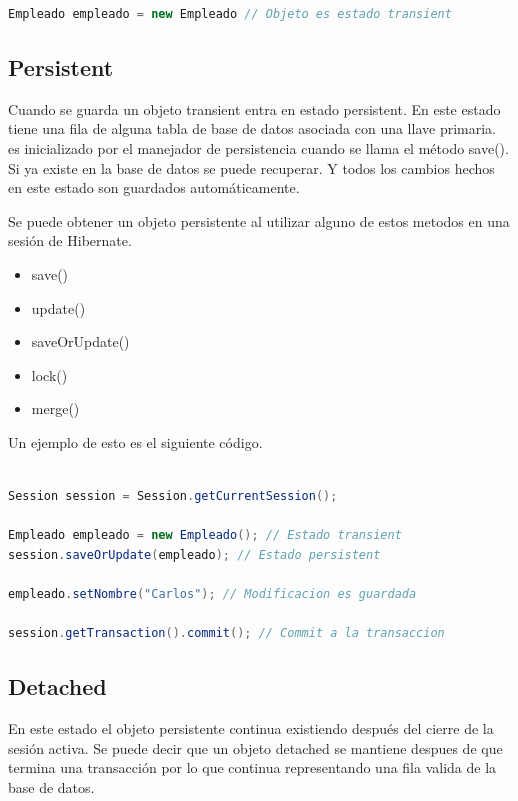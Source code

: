 \documentclass[a4paper,12pt]{article}
\begin{document}
\begin{lstlisting}[language=Java,style=customJava,basicstyle=\fontfamily{cmss}
\small]
Empleado empleado = new Empleado // Objeto es estado transient
\end{lstlisting}

\subsection{Persistent}
Cuando se guarda un objeto transient entra en estado persistent. En este estado 
tiene una fila de alguna tabla de base de datos asociada con una llave 
primaria. es inicializado por el manejador de persistencia cuando se llama el 
método save(). Si ya existe en la base de datos se puede recuperar. Y todos los 
cambios hechos en este estado son guardados automáticamente.

Se puede obtener un objeto persistente al utilizar alguno de estos metodos en 
una sesión de Hibernate.
\begin{itemize}
 \item save()
 \item update()
 \item saveOrUpdate()
 \item lock()
 \item merge()
\end{itemize}

Un ejemplo de esto es el siguiente código.
\begin{lstlisting}[language=Java,style=customJava,basicstyle=\fontfamily{cmss}
\small]

Session session = Session.getCurrentSession();

Empleado empleado = new Empleado(); // Estado transient
session.saveOrUpdate(empleado); // Estado persistent

empleado.setNombre("Carlos"); // Modificacion es guardada

session.getTransaction().commit(); // Commit a la transaccion

\end{lstlisting}

\subsection{Detached}
En este estado el objeto persistente continua existiendo después del cierre de 
la sesión activa. Se puede decir que un objeto detached se mantiene despues de 
que termina una transacción por lo que continua representando una fila valida 
de la base de datos.
\end{document}
